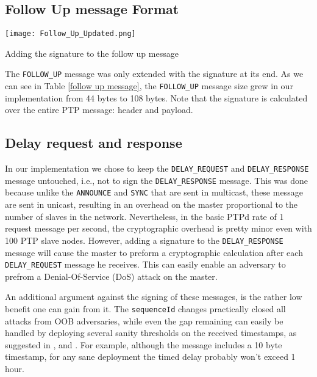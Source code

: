 \documentclass[11pt]{article}
\begin{document}
\subsection{Follow Up message Format}\label{sol:fu}



\begin{table}[t]

\centerline{\texttt{[image: Follow\_Up\_Updated.png]}}

\caption{Adding the signature to the follow up message}

\label{follow up message}

\end{table}



The \texttt{FOLLOW_UP} message was only extended with the signature at its end. As we can see in Table \ref{follow up message}, the \texttt{FOLLOW_UP} message size grew in our implementation from 44 bytes to 108 bytes. Note that the signature is calculated over the entire PTP message: header and payload.



\subsection{Delay request and response}\label{sol:delay}

In our implementation we chose to keep the \texttt{DELAY_REQUEST} and \texttt{DELAY_RESPONSE} message untouched, i.e., not to sign the \texttt{DELAY_RESPONSE} message. This was done because unlike the \texttt{ANNOUNCE} and \texttt{SYNC} that are sent in multicast, these message are sent in unicast, resulting in an overhead on the master proportional to the number of slaves in the network. Nevertheless, in the basic PTPd rate of 1 request message per second, the cryptographic overhead is pretty minor even with 100 PTP slave nodes. However, adding a signature to the \texttt{DELAY_RESPONSE} message will cause the master to preform a cryptographic calculation after each \texttt{DELAY_REQUEST} message he receives. This can easily enable an adversary to prefrom a Denial-Of-Service (DoS) attack on the master.



An additional argument against the signing of these messages, is the rather low benefit one can gain from it. The \texttt{sequenceId} changes practically closed all attacks from OOB adversaries, while even the gap remaining can easily be handled by deploying several sanity thresholds on the received timestamps, as suggested in \cite{Delay_Filter_1}, \cite{Delay_Filter_2} and \cite{game_theoretic}. For example, although the message includes a 10 byte timestamp, for any sane deployment the timed delay probably won't exceed 1 hour.
\end{document}
